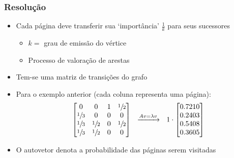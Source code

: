 \documentclass{beamer}
\begin{document}
\begin{frame}
    \frametitle{Resolução}
    \begin{itemize}
        \item Cada página deve transferir sua `importância' $\frac{1}{k}$ para
        seus sucessores
        \begin{itemize}
            \item $k =$ grau de emissão do vértice
            \item Processo de valoração de arestas
        \end{itemize}
        \item Tem-se uma matriz de transições do grafo
        \item Para o exemplo anterior (cada coluna representa uma página):
        \begin{equation*}
            \begin{bmatrix}
                0 & 0 & 1 & \sfrac{1}{2} \\
                \sfrac{1}{3} & 0 & 0 & 0 \\
                \sfrac{1}{3} & \sfrac{1}{2} & 0 & \sfrac{1}{2} \\
                \sfrac{1}{3} & \sfrac{1}{2} & 0 & 0
            \end{bmatrix} \ \
            \xrightarrow{Av = \lambda v} \ \
            1 \cdot
            \begin{bmatrix}
                0.7210 \\
                0.2403 \\
                0.5408 \\
                0.3605 \\
            \end{bmatrix}
        \end{equation*}
        \item O autovetor denota a probabilidade das páginas serem visitadas
    \end{itemize}
\end{frame}
\end{document}
